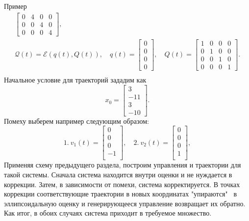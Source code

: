 \begin{section}{Пример}
\begin{gather*}
\begin{bmatrix}
        0 & 4 & 0 & 0 \\[0.3em]
        0 & 0 & 4 & 0 \\[0.3em]
        0 & 0 & 0 & 4
    \end{bmatrix}, \\
    \mathcal{Q}(t) = \mathcal{E}(q(t), Q(t)), \quad
    q(t) = \begin{bmatrix}
        0 \\[0.3em]
        0 \\[0.3em]
        0 \\[0.3em]
        0
    \end{bmatrix}, \quad
    Q(t) = \begin{bmatrix}
        1 & 0 & 0 & 0 \\[0.3em]
        0 & 1 & 0 & 0 \\[0.3em]
        0 & 0 & 1 & 0 \\[0.3em]
        0 & 0 & 0 & 1
    \end{bmatrix}. \\
\end{gather*}
Начальное условие для траекторий зададим как
\begin{equation*}
    x_0 = \begin{bmatrix}
        3 \\[0.3em]
        -11 \\[0.3em]
        3 \\[0.3em]
        -10
    \end{bmatrix}.
\end{equation*}
Помеху выберем например следующим образом:
\begin{equation*}
    1. \
    v_1(t) = \begin{bmatrix}
        0 \\[0.3em]
        0 \\[0.3em]
        0 \\[0.3em]
        -1 \\[0.3em]
    \end{bmatrix}, \quad 
    2. \
    v_2(t) = \begin{bmatrix}
        0 \\[0.3em]
        0 \\[0.3em]
        0 \\[0.3em]
        1 \\[0.3em]
    \end{bmatrix},
\end{equation*}
Применяя схему предыдущего раздела, построим управления и траектории для такой системы.
Сначала система находится внутри оценки и не нуждается в коррекции. Затем, в зависимости от помехи,
система корректируется. В точках коррекции соответствующие траектории в новых координатах "упираются" \ 
в эллипсоидальную оценку и генерирующееся управление возвращает их обратно. Как итог, в обоих случаях 
система приходит в требуемое множество.



\end{section}
